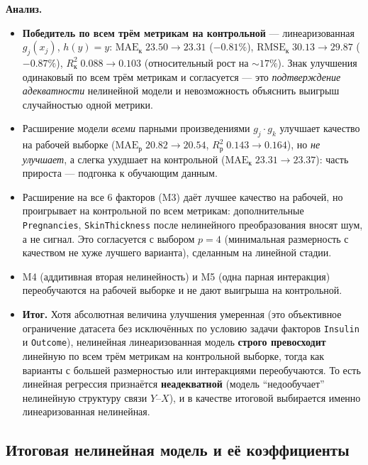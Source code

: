 \documentclass[a4paper, 14pt]{extarticle}
\begin{document}
\textbf{Анализ.}
\begin{itemize}
  \item \textbf{Победитель по всем трём метрикам на контрольной} --- линеаризованная $g_j(x_j)$, $h(y)=y$:
        $\mathrm{MAE}_{\text{к}}\;23.50\!\to\!23.31$ ($-0.81\%$), $\mathrm{RMSE}_{\text{к}}\;30.13\!\to\!29.87$ ($-0.87\%$),
        $R^{2}_{\text{к}}\;0.088\!\to\!0.103$ (относительный рост на $\sim 17\%$).
        Знак улучшения одинаковый по всем трём метрикам и согласуется --- это \emph{подтверждение адекватности} нелинейной модели и невозможность объяснить выигрыш случайностью одной метрики.
  \item Расширение модели \textit{всеми} парными произведениями $g_j\cdot g_k$ улучшает качество на рабочей выборке
        ($\mathrm{MAE}_{\text{р}}\;20.82\!\to\!20.54$, $R^2_{\text{р}}\;0.143\!\to\!0.164$), но \textit{не улучшает}, а слегка ухудшает на контрольной
        ($\mathrm{MAE}_{\text{к}}\;23.31\!\to\!23.37$): часть прироста --- подгонка к обучающим данным.
  \item Расширение на все 6 факторов (M3) даёт лучшее качество на рабочей, но проигрывает на контрольной по всем метрикам:
        дополнительные \texttt{Pregnancies}, \texttt{SkinThickness} после нелинейного преобразования вносят шум, а не сигнал.
        Это согласуется с выбором $p=4$ (минимальная размерность с качеством не хуже лучшего варианта), сделанным на линейной стадии.
  \item M4 (аддитивная вторая нелинейность) и M5 (одна парная интеракция) переобучаются на рабочей выборке
        и не дают выигрыша на контрольной.
  \item \textbf{Итог.} Хотя абсолютная величина улучшения умеренная (это объективное ограничение датасета без
        исключённых по условию задачи факторов \texttt{Insulin} и \texttt{Outcome}), нелинейная линеаризованная модель \textbf{строго превосходит} линейную
        по всем трём метрикам на контрольной выборке, тогда как варианты с большей размерностью или интеракциями
        переобучаются. То есть линейная регрессия признаётся \textbf{неадекватной} (модель ``недообучает''
        нелинейную структуру связи $Y$--$X$), и в качестве итоговой выбирается именно линеаризованная нелинейная.
\end{itemize}

\subsection{Итоговая нелинейная модель и её коэффициенты}\label{sec:nl-final}
\end{document}
